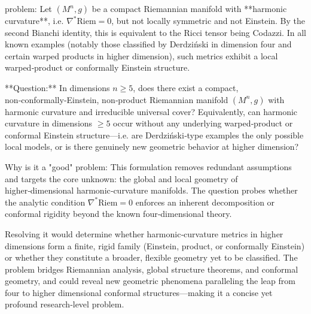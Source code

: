problem:  
Let $(M^n,g)$ be a compact Riemannian manifold with **harmonic curvature**, i.e. $\nabla^*{\mathrm{Riem}}=0$, but not locally symmetric and not Einstein.  By the second Bianchi identity, this is equivalent to the Ricci tensor being Codazzi.  In all known examples (notably those classified by Derdziński in dimension four and certain warped products in higher dimension), such metrics exhibit a local warped‑product or conformally Einstein structure.  

**Question:**  
In dimensions $n\ge 5$, does there exist a compact, non‑conformally‑Einstein, non‑product Riemannian manifold $(M^n,g)$ with harmonic curvature and irreducible universal cover?  
Equivalently, can harmonic curvature in dimensions $\ge5$ occur without any underlying warped‑product or conformal Einstein structure—i.e. are Derdziński‑type examples the only possible local models, or is there genuinely new geometric behavior at higher dimension?  

Why is it a "good" problem:  
This formulation removes redundant assumptions and targets the core unknown: the global and local geometry of higher‑dimensional harmonic‑curvature manifolds.  The question probes whether the analytic condition $\nabla^*\mathrm{Riem}=0$ enforces an inherent decomposition or conformal rigidity beyond the known four‑dimensional theory.  

Resolving it would determine whether harmonic‑curvature metrics in higher dimensions form a finite, rigid family (Einstein, product, or conformally Einstein) or whether they constitute a broader, flexible geometry yet to be classified.  The problem bridges Riemannian analysis, global structure theorems, and conformal geometry, and could reveal new geometric phenomena paralleling the leap from four to higher dimensional conformal structures—making it a concise yet profound research‑level problem.